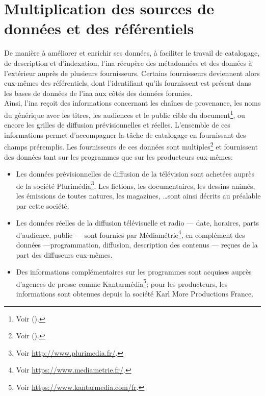 \section{\label{I-B-3}Multiplication des sources de données et des référentiels}

De manière à améliorer et enrichir ses données, à faciliter le travail de catalogage, de description et d'indexation, l'\ac{ina} récupère des métadonnées et des données à l'extérieur auprès de plusieurs fournisseurs. Certains fournisseurs deviennent alors eux-mêmes des référentiels, dont l'identifiant qu'ils fournissent est présent dans les bases de données de l'\ac{ina} aux côtés des données forunies.\\

Ainsi, l'\ac{ina} reçoit des informations concernant les chaînes de provenance, les noms du générique avec les titres, les audiences et le public cible du document\footnote{Voir  ().}, ou encore les grilles de diffusion prévisionnelles et réelles. L'ensemble de ces informations permet d'accompagner la tâche de catalogage en fournissant des champs préremplis. Les fournisseurs de ces données sont multiples\footnote{Voir  ().} et fournissent des données tant sur les programmes que sur les producteurs eux-mêmes: 
\begin{itemize}
	\item Les données prévisionnelles de diffusion de la télévision sont achetées auprès de la société Plurimédia\footnote{Voir \url{http://www.plurimedia.fr/}.}. Les fictions, les documentaires, les dessins animés, les émissions de toutes natures, les magazines, \dots sont ainsi décrits au préalable par cette société.
	\item Les données réelles de la diffusion télévisuelle et radio --- date, horaires, parts d'audience, public --- sont fournies par Médiamétrie\footnote{Voir \url{https://www.mediametrie.fr/}.}, en complément des données ---programmation, diffusion, description des contenus --- reçues de la part des diffuseurs eux-mêmes.
	\item Des informations complémentaires sur les programmes sont acquises auprès d'agences de presse comme Kantarmédia\footnote{Voir \url{https://www.kantarmedia.com/fr}.}; pour les producteurs, les informations sont obtenues depuis la société Karl More Productions France.
\end{itemize}
